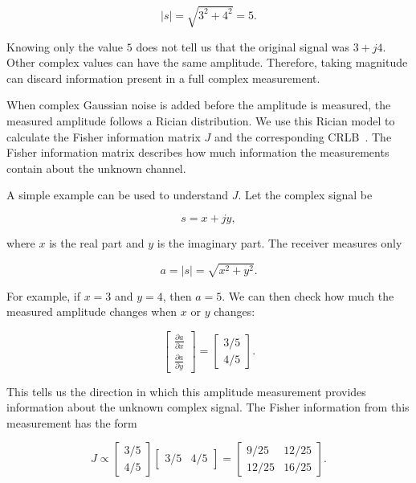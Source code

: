 \documentclass[journal]{IEEEtran}
\begin{document}
\begin{equation}
|s|
=
\sqrt{3^2+4^2}
=
5.
\end{equation}

Knowing only the value $5$ does not tell us that the original signal was
$3+j4$. Other complex values can have the same amplitude. Therefore, taking magnitude can discard information present in a full
complex measurement.

When complex Gaussian noise is added before the amplitude is measured, the
measured amplitude follows a Rician distribution. We use this Rician model
to calculate the Fisher information matrix $J$ and the corresponding
CRLB~\cite{balan2015,cui2025}. The Fisher information matrix describes how
much information the measurements contain about the unknown channel.

A simple example can be used to understand $J$. Let the complex signal be

\begin{equation}
s=x+jy,
\end{equation}

where $x$ is the real part and $y$ is the imaginary part. The receiver
measures only

\begin{equation}
a=|s|
=
\sqrt{x^2+y^2}.
\end{equation}

For example, if $x=3$ and $y=4$, then $a=5$. We can then check how much
the measured amplitude changes when $x$ or $y$ changes:

\begin{equation}
\begin{bmatrix}
\frac{\partial a}{\partial x}\\[2mm]
\frac{\partial a}{\partial y}
\end{bmatrix}
=
\begin{bmatrix}
3/5\\
4/5
\end{bmatrix}.
\end{equation}

This tells us the direction in which this amplitude measurement provides
information about the unknown complex signal. The Fisher information from
this measurement has the form

\begin{equation}
J
\propto
\begin{bmatrix}
3/5\\
4/5
\end{bmatrix}
\begin{bmatrix}
3/5 & 4/5
\end{bmatrix}
=
\begin{bmatrix}
9/25 & 12/25\\
12/25 & 16/25
\end{bmatrix}.
\end{equation}
\end{document}
